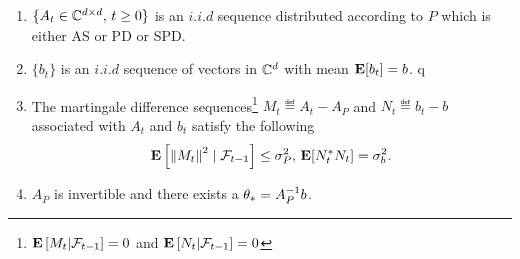 \begin{assumption}\label{assmp:lsa}
\begin{enumerate}[leftmargin=*, before = \leavevmode\vspace{-\baselineskip}]
\item \label{dist} $\{A_t\in\mathbb{C}^{d \times d},\, t\geq 0\}$ is an $i.i.d$ sequence distributed according to $P$ which is either AS or PD or SPD.
\item $\{b_t\}$ is an $i.i.d$ sequence of vectors in $\mathbb{C}^d$ with mean $\mathbf{E}[b_t]=b$.
q\item \label{matvar} The martingale difference sequences\footnote{$\mathbf{E}\left[M_t|\mathcal{F}_{t-1}\right]=0$ and $\mathbf{E}\left[N_t|\mathcal{F}_{t-1}\right]=0$} $M_t\eqdef A_t-A_P$ and $N_t\eqdef b_t-b$ associated with $A_t$ and $b_t$ satisfy the following
\begin{align*}\mathbf{E}\left[ \left\| M_t\right\|^2\mid\mathcal{F}_{t-1}\right]\leq \sigma^2_P, \, \mathbf{E}[N_t^* N_t]=\sigma_b^2.\end{align*}
\item $A_P$ is invertible and there exists a $\theta_*=A_P^{-1}b$.
\end{enumerate}
\end{assumption}
